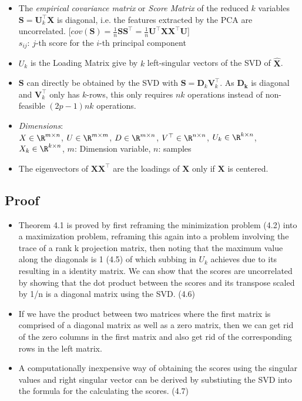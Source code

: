\documentclass[english]{latex4ei/latex4ei_sheet}
\begin{document}
\begin{sectionbox}
\begin{itemize}
\item The \emph{empirical covariance matrix} or \emph{Score Matrix} of the reduced $k$ variables $\mathbf{S}=\mathbf{U}_k^{\top}\mathbf{X}$ is diagonal, i.e. the features extracted by the PCA are uncorrelated.        [$cov(\mathbf{S})=\frac{1}{n}\mathbf{S}\mathbf{S}^{\top}=\frac{1}{n}\mathbf{U}^{\top}\mathbf{X}\mathbf{X}^{\top}\mathbf{U}$]\\
$s_{ij}$: $j$-th score for the $i$-th principal component
\item $U_k$ is the Loading Matrix give by $k$ left-singular vectors of the SVD of $\mathbf{\hat{X}}$.
\item $\mathbf{S}$ can directly be obtained by the SVD with $\mathbf{S}=\mathbf{D}_k\mathbf{V}_k^{\top}$. As $\mathbf{D_k}$ is diagonal and $\mathbf{V}_k^{\top}$ only has $k$-rows, this only requires $nk$ operations instead of non-feasible $(2p-1)nk$ operations.
\item \emph{Dimensions}:\\ $X\in\R^{m\times n}$, $U\in\R^{m\times m}$, $D\in\R^{m\times n}$, $V^{\top}\in\R^{n\times n}$, $U_k\in\R^{k\times n}$, $X_k\in\R^{k\times n}$, $m$: Dimension variable, $n$: samples
\item The eigenvectors of $\mathbf{X}\mathbf{X}^{\top}$ are the loadings of $\mathbf{X}$ only if $\mathbf{X}$ is centered.
\end{itemize}

\subsection{Proof}
\begin{itemize}
\item Theorem 4.1 is proved by first reframing the minimization problem (4.2) into a maximization problem, reframing this again into a problem involving the trace of a rank k projection matrix, then noting that the maximum value along the diagonals is 1 (4.5) of which subbing in $U_k$ achieves due to its resulting in a identity matrix.
We can show that the scores are uncorrelated by showing that the dot product between the scores and its transpose scaled by 1/n is a diagonal matrix using the SVD. (4.6)
\item If we have the product between two matrices where the first matrix is comprised of a diagonal matrix as well as a zero matrix, then we can get rid of the zero columns in the first matrix and also get rid of the corresponding rows in the left matrix.
\item A computationally inexpensive way of obtaining the scores using the singular values and right singular vector can be derived by substiuting the SVD into the formula for the calculating the scores. (4.7)
\end{itemize}


\end{sectionbox}
\end{document}
